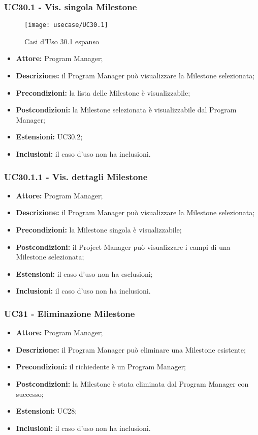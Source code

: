 \subsubsection*{UC30.1 - Vis. singola Milestone}
\begin{center}
\begin{figure}[H] 
    \centering 
    \texttt{[image: usecase/UC30.1]} 
    \caption{Casi d'Uso 30.1 espanso}
\end{figure}
\end{center}
\begin{itemize}[label=$\circ$]
\item \textbf{Attore:} Program Manager;
\item \textbf{Descrizione:} il Program Manager può visualizzare la Milestone selezionata;
\item \textbf{Precondizioni:} la lista delle Milestone è visualizzabile;
\item \textbf{Postcondizioni:} la Milestone selezionata è visualizzabile dal Program Manager;
\item \textbf{Estensioni:} UC30.2;
\item \textbf{Inclusioni:} il caso d'uso non ha inclusioni.
\end{itemize}

\subsubsection*{UC30.1.1 - Vis. dettagli Milestone}
\begin{itemize}[label=$\circ$]
\item \textbf{Attore:} Program Manager;
\item \textbf{Descrizione:} il Program Manager può visualizzare la Milestone selezionata;
\item \textbf{Precondizioni:} la Milestone singola è visualizzabile;
\item \textbf{Postcondizioni:} il Project Manager può visualizzare i campi di una Milestone selezionata;
\item \textbf{Estensioni:} il caso d'uso non ha esclusioni;
\item \textbf{Inclusioni:} il caso d'uso non ha inclusioni.
\end{itemize}

\subsubsection*{UC31 - Eliminazione Milestone}
\begin{itemize}[label=$\circ$]
\item \textbf{Attore:} Program Manager;
\item \textbf{Descrizione:} il Program Manager può eliminare una Milestone esistente;
\item \textbf{Precondizioni:} il richiedente è un Program Manager;
\item \textbf{Postcondizioni:} la Milestone è stata eliminata dal Program Manager con successo;
\item \textbf{Estensioni:} UC28;
\item \textbf{Inclusioni:} il caso d'uso non ha inclusioni.
\end{itemize}